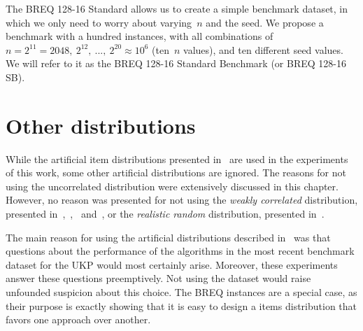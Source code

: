 The BREQ 128-16 Standard allows us to create a simple benchmark dataset, in which we only need to worry about varying~\(n\) and the seed.
We propose a benchmark with a hundred instances, with all combinations of~\(n = 2^{11} = 2048,~2^{12},~...,~2^{20} \approx 10^6\) (ten~\(n\) values), and ten different seed values.
We will refer to it as the BREQ 128-16 Standard Benchmark (or BREQ 128-16 SB).

\section{Other distributions}

While the artificial item distributions presented in~\cite{pya} are used in the experiments of this work, some other artificial distributions are ignored.
The reasons for not using the uncorrelated distribution were extensively discussed in this chapter.
However, no reason was presented for not using the \emph{weakly correlated} distribution, presented in~\cite{mtu1},~\cite{mtu2},~\cite{babayev} and~\cite{eduk}, or the \emph{realistic random} distribution, presented in~\cite{eduk}.

The main reason for using the artificial distributions described in~\cite{pya} was that questions about the performance of the algorithms in the most recent benchmark dataset for the UKP would most certainly arise. Moreover, these experiments answer these questions preemptively.
Not using the dataset would raise unfounded suspicion about this choice.
The BREQ instances are a special case, as their purpose is exactly showing that it is easy to design a items distribution that favors one approach over another. 


